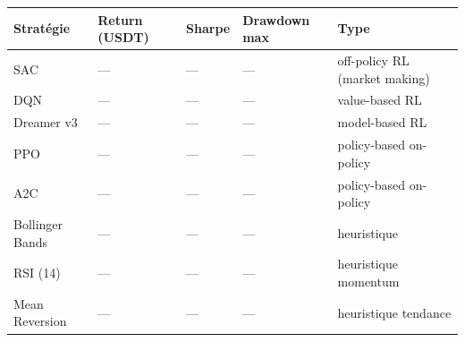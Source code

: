 \begin{center}
\scriptsize
\begin{tabularx}{\textwidth}{lXXXX}
    \toprule
    \textbf{Stratégie} & \textbf{Return (USDT)} & \textbf{Sharpe} & \textbf{Drawdown max} & \textbf{Type} \\
    \midrule
    SAC             & --- & --- & --- & off-policy RL (market making) \\
    DQN             & --- & --- & --- & value-based RL \\
    Dreamer v3      & --- & --- & --- & model-based RL \\
    PPO             & --- & --- & --- & policy-based on-policy \\
    A2C             & --- & --- & --- & policy-based on-policy \\
    Bollinger Bands & --- & --- & --- & heuristique \\
    RSI (14)        & --- & --- & --- & heuristique momentum \\
    Mean Reversion  & --- & --- & --- & heuristique tendance \\
    \bottomrule
\end{tabularx}
\end{center}
